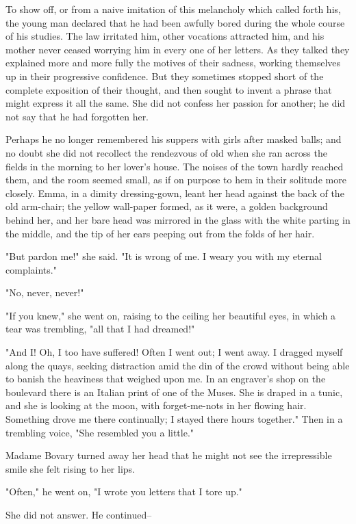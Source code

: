 \documentclass{tufte-book}
\begin{document}
To show off, or from a naive imitation of this melancholy which called
forth his, the young man declared that he had been awfully bored during
the whole course of his studies. The law irritated him, other vocations
attracted him, and his mother never ceased worrying him in every one
of her letters. As they talked they explained more and more fully the
motives of their sadness, working themselves up in their progressive
confidence. But they sometimes stopped short of the complete exposition
of their thought, and then sought to invent a phrase that might express
it all the same. She did not confess her passion for another; he did not
say that he had forgotten her.

Perhaps he no longer remembered his suppers with girls after masked
balls; and no doubt she did not recollect the rendezvous of old when she
ran across the fields in the morning to her lover's house. The noises
of the town hardly reached them, and the room seemed small, as if
on purpose to hem in their solitude more closely. Emma, in a dimity
dressing-gown, leant her head against the back of the old arm-chair; the
yellow wall-paper formed, as it were, a golden background behind her,
and her bare head was mirrored in the glass with the white parting in
the middle, and the tip of her ears peeping out from the folds of her
hair.

"But pardon me!" she said. "It is wrong of me. I weary you with my
eternal complaints."

"No, never, never!"

"If you knew," she went on, raising to the ceiling her beautiful eyes,
in which a tear was trembling, "all that I had dreamed!"

"And I! Oh, I too have suffered! Often I went out; I went away. I
dragged myself along the quays, seeking distraction amid the din of the
crowd without being able to banish the heaviness that weighed upon me.
In an engraver's shop on the boulevard there is an Italian print of one
of the Muses. She is draped in a tunic, and she is looking at the
moon, with forget-me-nots in her flowing hair. Something drove me there
continually; I stayed there hours together." Then in a trembling voice,
"She resembled you a little."

Madame Bovary turned away her head that he might not see the
irrepressible smile she felt rising to her lips.

"Often," he went on, "I wrote you letters that I tore up."

She did not answer. He continued--
\end{document}
